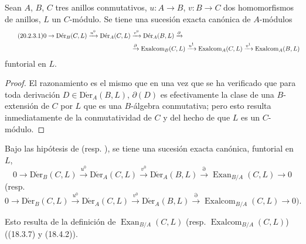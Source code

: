 \begin{corollary}[20.2.3]
\label{0.20.2.3-fr}
Sean $A$, $B$, $C$ tres anillos conmutativos, $u:A\to B$, $v:B\to C$
dos homomorfismos de anillos, $L$ un $C$-módulo. Se tiene una sucesión exacta
canónica de $A$-módulos
\begin{align}
\tag{20.2.3.1}
\label{0.20.2.3.1-fr}
  0\to\operatorname{D\acute{e}r}_B(C,L)\xrightarrow{u^0}
  \operatorname{D\acute{e}r}_A(C,L)&\xrightarrow{v^0}
  \operatorname{D\acute{e}r}_A(B,L)\xrightarrow{\partial} \\
  &\xrightarrow{\partial}\operatorname{Exalcom}_B(C,L)\xrightarrow{u^1}
  \operatorname{Exalcom}_A(C,L)\xrightarrow{v^1}
  \operatorname{Exalcom}_A(B,L) \notag
\end{align}
funtorial en $L$.
\end{corollary}

\begin{proof}
El razonamiento es el mismo que en  una vez que se ha
verificado que para toda derivación $D\in\operatorname{D\acute{e}r}_A(B,L)$,
$\partial(D)$ es efectivamente la clase de una $B$-extensión de $C$ por $L$ que es
una $B$-álgebra conmutativa; pero esto resulta inmediatamente de la conmutatividad
de $C$ y del hecho de que $L$ es un $C$-módulo.
\end{proof}

\begin{corollary}[20.2.4]
\label{0.20.2.4-fr}
Bajo las hipótesis de  \textup{(resp.}
), se tiene una sucesión exacta canónica, funtorial en $L$,
\begin{equation}
\tag{20.2.4.1}
\label{0.20.2.4.1-fr}
  0\to\operatorname{D\acute{e}r}_B(C,L)\xrightarrow{u^0}
  \operatorname{D\acute{e}r}_A(C,L)\xrightarrow{v^0}
  \operatorname{D\acute{e}r}_A(B,L)\xrightarrow{\partial}
  \operatorname{Exan}_{B/A}(C,L)\to0
\end{equation}
\textup{(resp.}
\begin{equation}
\tag{20.2.4.2}
\label{0.20.2.4.2-fr}
  0\to\operatorname{D\acute{e}r}_B(C,L)\xrightarrow{u^0}
  \operatorname{D\acute{e}r}_A(C,L)\xrightarrow{v^0}
  \operatorname{D\acute{e}r}_A(B,L)\xrightarrow{\partial}
  \operatorname{Exalcom}_{B/A}(C,L)\to0\text{).}
\end{equation}
\end{corollary}
\noindent Esto resulta de la definición de $\operatorname{Exan}_{B/A}(C,L)$ (resp.
$\operatorname{Exalcom}_{B/A}(C,L)$) ((18.3.7) y (18.4.2)).


